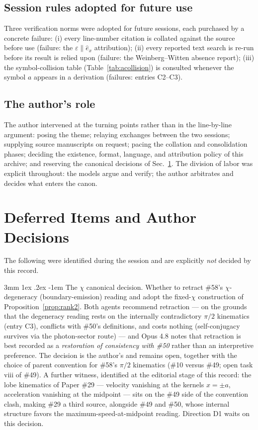\documentclass[%
 reprint, amsmath,amssymb, aps, prb, ]{revtex4-2}
\makeatletter
\numberwithin{equation}{section}
\renewcommand\paragraph{%
  \@startsection{paragraph}{4}{\z@}%
    {3mm \@plus 1ex \@minus .2ex}%
    {-1em}%
    {\normalfont\normalsize\itshape}}
\makeatother
\begin{document}
\subsection{Session rules adopted for future use}

Three verification norms were adopted for future sessions, each purchased by a concrete failure: (i) every line-number citation is collated against the source before use (failure: the $\varepsilon\parallel\hat e_x$ attribution); (ii) every reported text search is re-run before its result is relied upon (failure: the Weinberg--Witten absence report); (iii) the symbol-collision table (Table~\ref{tab:acollision}) is consulted whenever the symbol $a$ appears in a derivation (failures: entries C2--C3).

\subsection{The author's role}

The author intervened at the turning points rather than in the line-by-line argument: posing the theme; relaying exchanges between the two sessions; supplying source manuscripts on request; pacing the collation and consolidation phases; deciding the existence, format, language, and attribution policy of this archive; and reserving the canonical decisions of Sec.~\ref{sec:deferred}. The division of labor was explicit throughout: the models argue and verify; the author arbitrates and decides what enters the canon.

\section{Deferred Items and Author Decisions}
\label{sec:deferred}

The following were identified during the session and are explicitly \emph{not} decided by this record.

\paragraph{The $\chi$ canonical decision.} Whether to retract \#58's $\chi$-degeneracy (boundary-emission) reading and adopt the fixed-$\chi$ construction of Proposition~\ref{prop:rank2}. Both agents recommend retraction --- on the grounds that the degeneracy reading rests on the internally contradictory $\pi/2$ kinematics (entry C3), conflicts with \#50's definitions, and costs nothing (self-conjugacy survives via the photon-sector route) --- and Opus 4.8 notes that retraction is best recorded as a \emph{restoration of consistency with \#50} rather than an interpretive preference. The decision is the author's and remains open, together with the choice of parent convention for \#58's $\pi/2$ kinematics (\#10 versus \#49; open task viii of \#49). A further witness, identified at the editorial stage of this record: the lobe kinematics of Paper \#29 --- velocity vanishing at the kernels $x=\pm a$, acceleration vanishing at the midpoint --- sits on the \#49 side of the convention clash, making \#29 a third source, alongside \#49 and \#50, whose internal structure favors the maximum-speed-at-midpoint reading. Direction D1 waits on this decision.
\end{document}
